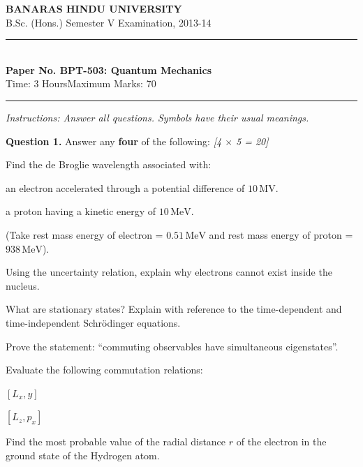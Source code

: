 \documentclass[11pt,a4paper]{article}
\newcommand{\pts}[1]{\hfill   \textit{[#1]}}
\begin{document}
\begin{center}
  {\large\bfseries BANARAS HINDU UNIVERSITY}\\[2pt]
  {\normalsize B.Sc. (Hons.) Semester V Examination, 2013-14}\\[6pt]
  \rule{0.8\linewidth}{0.5pt}\\[6pt]
  {\large\bfseries Paper No. BPT-503: Quantum Mechanics}\\[4pt]
  {\normalsize Time: 3 Hours\hfill Maximum Marks: 70}
\end{center}
\rule{\linewidth}{0.4pt}
\smallskip



\noindent   \textit{Instructions: Answer all questions. Symbols have their usual meanings.}
\bigskip




\noindent   \textbf{Question 1.} Answer any   \textbf{four} of the following: \pts{4 $ \times$ 5 = 20}

\begin{parts}
  \item Find the de Broglie wavelength associated with:
    
\begin{parts}
      \item an electron accelerated through a potential difference of $10\, \text{MV}$.
      \item a proton having a kinetic energy of $10\, \text{MeV}$.
    \end{parts}
    (Take rest mass energy of electron = $0.51\, \text{MeV}$ and rest mass energy of proton = $938\, \text{MeV}$).
  \item Using the uncertainty relation, explain why electrons cannot exist inside the nucleus.
  \item What are stationary states? Explain with reference to the time-dependent and time-independent Schr\"{o}dinger equations.
  \item Prove the statement: ``commuting observables have simultaneous eigenstates''.
  \item Evaluate the following commutation relations:
    
\begin{parts}
      \item $[L_x, y]$
      \item $[L_z, p_x]$
    \end{parts}
  \item Find the most probable value of the radial distance $r$ of the electron in the ground state of the Hydrogen atom.
\end{parts}
\end{document}
